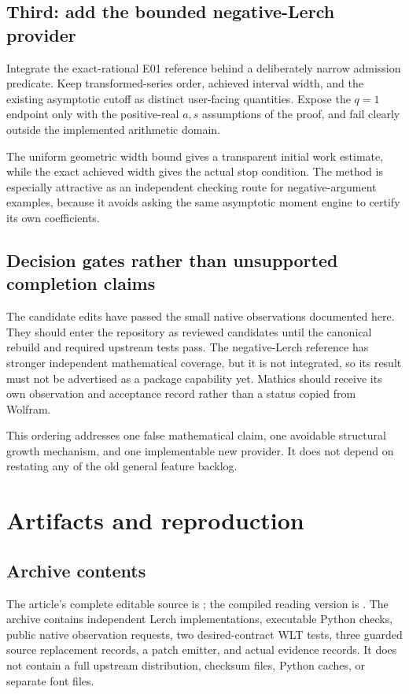 \documentclass[11pt,a4paper]{article}
\begin{document}
\subsection{Third: add the bounded negative-Lerch provider}
Integrate the exact-rational E01 reference behind a deliberately narrow admission predicate. Keep transformed-series order, achieved interval width, and the existing asymptotic cutoff as distinct user-facing quantities. Expose the $q=1$ endpoint only with the positive-real $a,s$ assumptions of the proof, and fail clearly outside the implemented arithmetic domain.

The uniform geometric width bound gives a transparent initial work estimate, while the exact achieved width gives the actual stop condition. The method is especially attractive as an independent checking route for negative-argument examples, because it avoids asking the same asymptotic moment engine to certify its own coefficients.

\subsection{Decision gates rather than unsupported completion claims}
The candidate edits have passed the small native observations documented here. They should enter the repository as reviewed candidates until the canonical rebuild and required upstream tests pass. The negative-Lerch reference has stronger independent mathematical coverage, but it is not integrated, so its result must not be advertised as a package capability yet. Mathics should receive its own observation and acceptance record rather than a status copied from Wolfram.

This ordering addresses one false mathematical claim, one avoidable structural growth mechanism, and one implementable new provider. It does not depend on restating any of the old general feature backlog.

\section{Artifacts and reproduction}
\label{sec:artifacts}
\subsection{Archive contents}
The article's complete editable source is ; the compiled reading version is . The archive contains independent Lerch implementations, executable Python checks, public native observation requests, two desired-contract WLT tests, three guarded source replacement records, a patch emitter, and actual evidence records. It does not contain a full upstream distribution, checksum files, Python caches, or separate font files.
\end{document}
